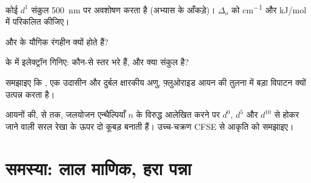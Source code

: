 \begin{exercise}[$\star\star$]\label{exo:b2:ligand-field:8}
कोई $d^1$ संकुल \qty{500}{nm} पर अवशोषण करता है (अभ्यास के आँकड़े)। $\Delta_o$ को \unit{cm^{-1}} और
\unit{kJ/mol} में परिकलित कीजिए।
\end{exercise}

\begin{exercise}[$\star\star$]\label{exo:b2:ligand-field:9}
 और  के यौगिक रंगहीन क्यों होते हैं?
\end{exercise}

\begin{exercise}[$\star\star\star$]\label{exo:b2:ligand-field:10}
 के  में इलेक्ट्रॉन गिनिए: कौन-से स्तर भरे हैं,
और क्या संकुल  है?
\end{exercise}

\begin{exercise}[$\star\star\star$]\label{exo:b2:ligand-field:11}
समझाइए कि , एक उदासीन और दुर्बल क्षारकीय अणु, फ़्लुओराइड आयन की तुलना में
बड़ा विपाटन क्यों उत्पन्न करता है।
\end{exercise}

\begin{exercise}[$\star\star\star$]\label{exo:b2:ligand-field:12}
 आयनों की,  से  तक, जलयोजन एन्थैल्पियाँ $n$ के विरुद्ध आलेखित करने पर
$d^0$, $d^5$ और $d^{10}$ से होकर जाने वाली सरल रेखा के ऊपर दो कूबड़ बनाती हैं। उच्च-चक्रण CFSE से
आकृति को समझाइए।
\end{exercise}

\section{समस्या: लाल माणिक, हरा पन्ना}

